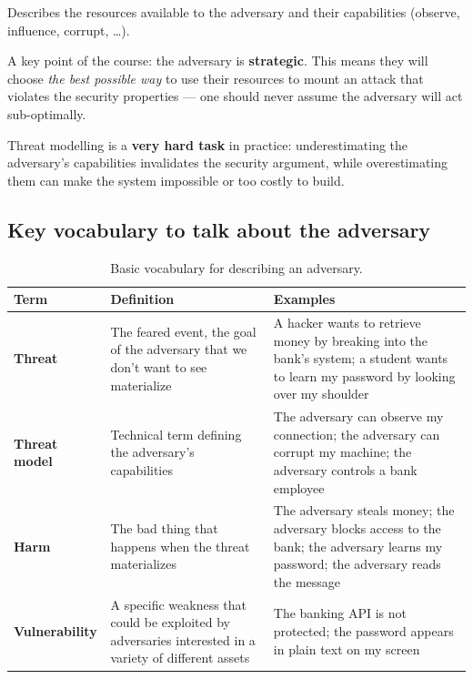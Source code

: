 \begin{definition}
Describes the resources available to the adversary and their capabilities (observe, influence, corrupt, \dots).
\end{definition}

A key point of the course: the adversary is \textbf{strategic}. This means they will choose \emph{the best possible way} to use their resources to mount an attack that violates the security properties — one should never assume the adversary will act sub-optimally.

\begin{remark}
Threat modelling is a \textbf{very hard task} in practice: underestimating the adversary's capabilities invalidates the security argument, while overestimating them can make the system impossible or too costly to build.
\end{remark}

\subsection{Key vocabulary to talk about the adversary}

\begin{table}[h]
\centering
\begin{tabular}{@{}p{2.3cm}p{5.7cm}p{5cm}@{}}
\toprule
\textbf{Term} & \textbf{Definition} & \textbf{Examples} \\
\midrule
\textbf{Threat} & The feared event, the goal of the adversary that we don't want to see materialize &
A hacker wants to retrieve money by breaking into the bank's system; a student wants to learn my password by looking over my shoulder \\[4pt]
\textbf{Threat model} & Technical term defining the adversary's capabilities &
The adversary can observe my connection; the adversary can corrupt my machine; the adversary controls a bank employee \\[4pt]
\textbf{Harm} & The bad thing that happens when the threat materializes &
The adversary steals money; the adversary blocks access to the bank; the adversary learns my password; the adversary reads the message \\[4pt]
\textbf{Vulnerability} & A specific weakness that could be exploited by adversaries interested in a variety of different assets &
The banking API is not protected; the password appears in plain text on my screen \\
\bottomrule
\end{tabular}
\caption{Basic vocabulary for describing an adversary.}
\end{table}

